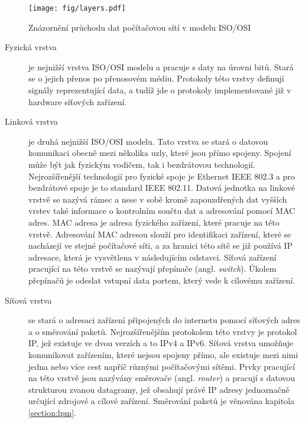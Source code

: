 \begin{figure}[!htbp]
	\centering
	\texttt{[image: fig/layers.pdf]}
	\caption{Znázornění průchodu dat počítačovou sítí v modelu ISO/OSI}
    \label{fig:layers}
\end{figure}

\begin{description}
\item[Fyzická vrstva]\label{layers:physical} %
je nejnižší vrstva ISO/OSI modelu a pracuje s daty na úrovni bitů. Stará se o
jejich přenos po přenosovém médiu. Protokoly této vrstvy definují signály reprezentující data,
a tudíž jde o protokoly implementované již v hardware síťových zařízení.

\item[Linková vrstva]\label{layers:link} %
je druhá nejnižší ISO/OSI modelu. Tato vrstva se stará o datovou komunikaci
obecně mezi několika uzly, které jsou přímo spojeny. Spojení může být jak fyzickým vodičem, tak i
bezdrátovou technologií. Nejrozšířenější technologií pro fyzické spoje je Ethernet IEEE 802.3 a pro bezdrátové spoje
je to standard IEEE 802.11. Datová jednotka na linkové vrstvě se nazývá rámec a nese v sobě kromě
zapouzdřených dat vyšších vrstev také informace o kontrolním součtu dat a adresování pomocí MAC adres.
MAC adresa je adresa fyzického zařízení, které pracuje na této vrstvě.
Adresování MAC adresou slouží pro identifikaci zařízení, které se nacházejí ve stejné počítačové síti,
a za hranici této sítě se již používá IP adresace, která je vysvětlena v následujícím odstavci.
Síťová zařízení pracující na této vrstvě se nazývají přepínače (angl. \textit{switch}).
Úkolem přepínačů je odeslat vstupní data portem, který vede k cílovému zařízení.

\item[Síťová vrstva]\label{layers:network} %
se stará o adresaci zařízení připojených do internetu pomocí síťových adres a o směrování paketů.
Nejrozšířenějším protokolem této vrstvy je protokol IP, jež existuje ve dvou verzích a to IPv4 a IPv6.
Síťová vrstva umožňuje komunikovat zařízením, které nejsou spojeny přímo, ale existuje mezi nimi jedna nebo více cest
napříč různými počítačovými sítěmi.
Prvky pracující na této vrstvě jsou nazývány směrovače (angl. \textit{router}) a pracují s datovou strukturou zvanou
datagramy, jež obsahují právě IP adresy jednoznačně určující zdrojové a cílové zařízení. Směrování paketů
je věnována kapitola \ref{section:lpm}.


\end{description}
